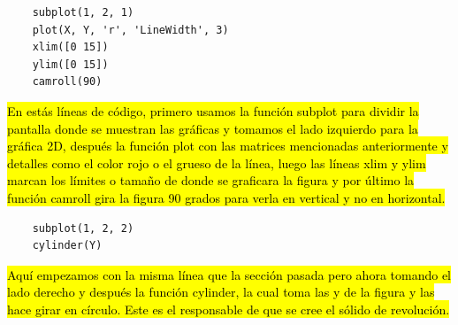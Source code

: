 \begin{lstlisting}[style=Matlab-editor]
    %grafica 2D
    subplot(1, 2, 1)
    plot(X, Y, 'r', 'LineWidth', 3)
    xlim([0 15])
    ylim([0 15])
    camroll(90)
\end{lstlisting}

\hl{\tab En estás líneas de código, primero usamos la función subplot para dividir la pantalla donde se muestran las gráficas y tomamos el lado izquierdo para la gráfica 2D, después la función plot con las matrices mencionadas anteriormente y detalles como el color rojo o el grueso de la línea, luego las líneas xlim y ylim marcan los límites o tamaño de donde se graficara la figura y por último la función camroll gira la figura 90 grados para verla en vertical y no en horizontal.
}
\begin{lstlisting}[style=Matlab-editor]
    %grafica 3d
    subplot(1, 2, 2)
    cylinder(Y)
\end{lstlisting}

\hl{\tab Aquí empezamos con la misma línea que la sección pasada pero ahora tomando el lado derecho y después la función cylinder, la cual toma las y de la figura y las hace girar en círculo. Este es el responsable de que se cree el sólido de revolución.}
